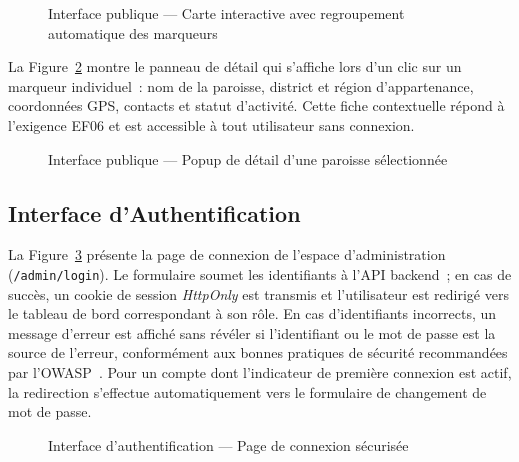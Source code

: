 \begin{figure}[H]
  \centering
  \caption{Interface publique --- Carte interactive avec regroupement automatique des marqueurs}
  \label{fig:res-carte-publique}
\end{figure}

La Figure~\ref{fig:res-popup} montre le panneau de détail qui s'affiche lors
d'un clic sur un marqueur individuel~: nom de la paroisse, district et région
d'appartenance, coordonnées GPS, contacts et statut d'activité. Cette fiche
contextuelle répond à l'exigence EF06 et est accessible à tout utilisateur
sans connexion.

\begin{figure}[H]
  \centering
  \caption{Interface publique --- Popup de détail d'une paroisse sélectionnée}
  \label{fig:res-popup}
\end{figure}

\subsection{Interface d'Authentification}
\label{ssec:res-auth}

La Figure~\ref{fig:res-login} présente la page de connexion de l'espace
d'administration (\texttt{/admin/login}). Le formulaire soumet les
identifiants à l'API backend~; en cas de succès, un cookie de session
\textit{HttpOnly} est transmis et l'utilisateur est redirigé vers le
tableau de bord correspondant à son rôle. En cas d'identifiants incorrects,
un message d'erreur est affiché sans révéler si l'identifiant ou le mot de
passe est la source de l'erreur, conformément aux bonnes pratiques de
sécurité recommandées par l'OWASP~\cite{owasp2021}. Pour un compte dont
l'indicateur de première connexion est actif, la redirection s'effectue
automatiquement vers le formulaire de changement de mot de passe.

\begin{figure}[H]
  \centering
  \caption{Interface d'authentification --- Page de connexion sécurisée}
  \label{fig:res-login}
\end{figure}


